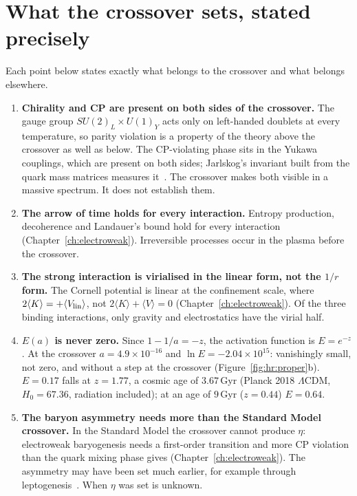 \section{What the crossover sets, stated precisely}\label{sec:hr:corrections}
Each point below states exactly what belongs to the crossover and what belongs elsewhere.
\begin{enumerate}
\item \textbf{Chirality and CP are present on both sides of the crossover.} The gauge group $SU(2)_L\times U(1)_Y$ acts only on left-handed doublets at every
temperature, so parity violation is a property of the theory above the crossover as well as below. The CP-violating phase sits in the Yukawa
couplings, which are present on both sides; Jarlskog's invariant built from the quark mass matrices measures it~\cite{Jarlskog1985}. \observed{}
The crossover makes both visible in a massive spectrum. It does not establish them.
\item \textbf{The arrow of time holds for every interaction.} Entropy production, decoherence and Landauer's bound hold for every interaction
(Chapter~\ref{ch:electroweak}). Irreversible processes occur in the plasma before the crossover. \derived
\item \textbf{The strong interaction is virialised in the linear form, not the $1/r$ form.} The Cornell potential is linear at the confinement scale, where
$2\langle K\rangle=+\langle V_{\rm lin}\rangle$, not $2\langle K\rangle+\langle V\rangle=0$ (Chapter~\ref{ch:electroweak}). Of the three binding
interactions, only gravity and electrostatics have the virial half. \derived
\item \textbf{$E(a)$ is never zero.} Since $1-1/a=-z$, the activation function is $E=e^{-z}$. At the crossover $a=4.9\times10^{-16}$ and
$\ln E=-2.04\times10^{15}$: vanishingly small, not zero, and without a step at the crossover (Figure~\ref{fig:hr:proper}b). \calc{} $E=0.17$ falls
at $z=1.77$, a cosmic age of $3.67$\,Gyr (Planck 2018 $\Lambda$CDM, $H_0=67.36$, radiation included); at an age of $9$\,Gyr ($z=0.44$) $E=0.64$. \calc
\item \textbf{The baryon asymmetry needs more than the Standard Model crossover.} In the Standard Model the crossover cannot produce $\eta$: electroweak baryogenesis
needs a first-order transition and more CP violation than the quark mixing phase gives (Chapter~\ref{ch:electroweak}). The asymmetry may have
been set much earlier, for example through leptogenesis~\cite{FukugitaYanagida1986}. When $\eta$ was set is unknown. \observed

\end{enumerate}
